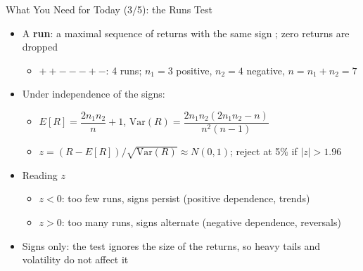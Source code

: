 \begin{frame}{What You Need for Today (3/5): the Runs Test}
\itemsize{\small}
\begin{itemize}
    \item A \textbf{run}: a maximal sequence of returns with the same sign ; zero returns are dropped
    \begin{itemize}
        \item $+ + - - - + -$: 4 runs; $n_1 = 3$ positive, $n_2 = 4$ negative, $n = n_1 + n_2 = 7$
    \end{itemize}
    \item Under independence of the signs:
    \begin{itemize}
        \item $E[R] = \dfrac{2n_1n_2}{n} + 1$, \quad $\mathrm{Var}(R) = \dfrac{2n_1n_2(2n_1n_2 - n)}{n^2(n-1)}$
        \item $z = (R - E[R])/\sqrt{\mathrm{Var}(R)} \approx N(0, 1)$; reject at 5\% if $|z| > 1.96$
    \end{itemize}
    \item Reading $z$
    \begin{itemize}
        \item $z < 0$: too few runs, signs persist (positive dependence, trends)
        \item $z > 0$: too many runs, signs alternate (negative dependence, reversals)
    \end{itemize}
    \item Signs only: the test ignores the size of the returns, so heavy tails and volatility do not affect it
\end{itemize}
\end{frame}

